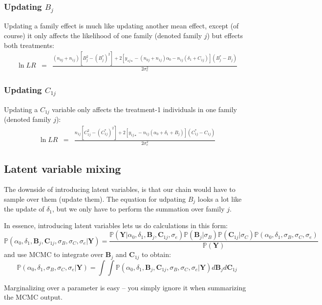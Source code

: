 \documentclass[11pt]{article}
\renewcommand{\Pr}{{\mathbb P}}
\begin{document}
\subsubsection*{Updating $B_j$}
Updating a family effect is much like updating another mean effect, except (of course) it only affects the likelihood of one family (denoted family $j$) but effects both treatments:
\begin{eqnarray*}
\ln LR & = & \frac{(n_{0j} + n_{1j})\left[B_j^2 - (B_j^{\ast})^2\right]  + 2\left[y_{\star j\star} - (n_{0j} + n_{1j})\alpha_0 - n_{1j}(\delta_1  + C_{1j})\right](B_j^\ast - B_j)}{2\sigma_e^2} 
\end{eqnarray*}

\subsubsection*{Updating $C_{1j}$}
Updating a $C_{1j}$ variable only affects the treatment-1 individuals in one family (denoted family $j$):
\begin{eqnarray*}
\ln LR & = & \frac{n_{1j}\left[C_{1j}^2 - (C_{1j}^{\ast})^2\right]  + 2\left[y_{1 j\star} - n_{1j}(\alpha_0 + \delta_1  + B_j)\right](C_{1j}^\ast - C_{1j})}{2\sigma_e^2} 
\end{eqnarray*}

\subsection*{Latent variable mixing}
The downside of introducing latent variables, is that our chain would have to sample over them (update them).
The equation for udpating $B_j$ looks a lot like the update of $\delta_1$, but we only have to perform the summation over family $j$.


In essence, introducing latent variables lets us do calculations in this form:
$$\Pr(\alpha_0,\delta_1, \bm B_j, \bm C_{1j}, \sigma_B, \sigma_C, \sigma_e | \bm Y) = \frac{\Pr(\bm Y|\alpha_0,\delta_1, \bm B_j, \bm C_{1j}, \sigma_e)\Pr(\bm B_j|\sigma_B)\Pr(\bm C_{1j}|\sigma_C)\Pr(\alpha_0,\delta_1, \sigma_B, \sigma_C, \sigma_e)}{\Pr(\bm Y)} $$
and use MCMC to integrate over $\bm B_j$ and $\bm C_{1j}$ to obtain:
$$\Pr(\alpha_0,\delta_1, \sigma_B, \sigma_C, \sigma_e | \bm Y) = \int\int \Pr(\alpha_0,\delta_1, \bm B_j, \bm C_{1j}, \sigma_B, \sigma_C, \sigma_e | \bm Y) d \bm B_j d \bm C_{1j} $$

Marginalizing over a parameter is easy -- you simply ignore it when summarizing the MCMC output.


\newpage

\end{document}
